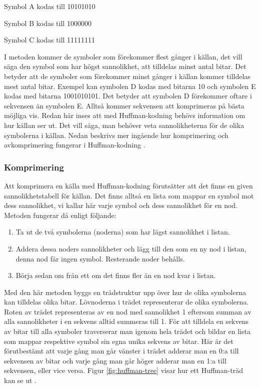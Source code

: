 \bigskip
\noindent Symbol A kodas till 10101010

\noindent Symbol B kodas till 1000000

\noindent Symbol C kodas till 11111111

\bigskip
\noindent I metoden kommer de symboler som förekommer flest gånger i källan, det vill säga den symbol som har högst sannolikhet, att tilldelas minst antal bitar. Det betyder att de symboler som förekommer minst gånger i källan kommer tilldelas mest antal bitar. Exempel kan symbolen D kodas med bitarna 10 och symbolen E kodas med bitarna 1001010101. Det betyder att symbolen D förekommer oftare i sekvensen än symbolen E. Alltså kommer sekvensen att komprimeras på bästa möjliga vis.  Redan här inses att med Huffman-kodning behövs information om hur källan ser ut. Det vill säga, man behöver veta sannolikheterna för de olika symbolerna i källan. Nedan beskrivs mer ingående hur komprimering och avkomprimering fungerar i Huffman-kodning \cite{huffmancoding2018}.
	\subsubsection{Komprimering}
	Att komprimera en källa med Huffman-kodning förutsätter att det finns en given sannolikhetstabell för källan. Det finns alltså en lista som mappar en symbol mot dess sannolikhet, vi kallar här varje symbol och dess sannolikhet för en nod. Metoden fungerar då enligt följande:
	\begin{enumerate}
	\item Ta ut de två symbolerna (noderna) som har lägst sannolikhet i listan.
	\item Addera dessa noders sannolikheter och lägg till den som en ny nod i listan, denna nod får ingen symbol. Resterande noder behålls.
	\item Börja sedan om från ett om det finns fler än en nod kvar i listan.
	\end{enumerate}
	Med den här metoden byggs en trädstruktur upp över hur de olika symbolerna kan tilldelas olika bitar. Lövnoderna i trädet representerar de olika symbolerna. Roten av trädet representeras av en nod med sannolikhet 1 eftersom summan av alla sannolikheter i en sekvens alltid summeras till 1. För att tilldela en sekvens av bitar till alla symboler traverserar man igenom hela trädet och bildar en lista som mappar respektive symbol sin egna unika sekvens av bitar. Här är det förutbestämt att varje gång man går vänster i trädet adderar man en 0:a till sekvensen av bitar och varje gång man går höger adderar man en 1:a till sekvensen, eller vice versa. Figur \ref{fig:huffman-tree} visar hur ett Huffman-träd kan se ut \cite{huffmancoding2018}.


